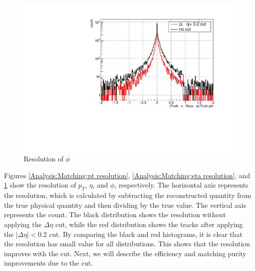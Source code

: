                 \begin{figure}[H]
                    \centering
                    \includegraphics[keepaspectratio, scale=0.4]{fig/3_5_6_reso_phi.pdf} 
                    \caption{Resolution of $\phi$}
                    \label{Analysis:Matching:phi resolution}
                \end{figure}
            Figures \ref{Analysis:Matching:pt resolution}, \ref{Analysis:Matching:eta resolution}, and \ref{Analysis:Matching:phi resolution} show the resolution of \(p_T\), \(\eta\), and \(\phi\), respectively. The horizontal axis represents the resolution, which is calculated by subtracting the reconstructed quantity from the true physical quantity and then dividing by the true value. The vertical axis represents the count. The black distribution shows the resolution without applying the \(\Delta \eta\) cut, while the red distribution shows the tracks after applying the \(|\Delta \eta| < 0.2\) cut. By comparing the black and red histograms, it is clear that the resolution has small value for all distributions. This shows that the resolution improves with the cut. Next, we will describe the efficiency and matching purity improvements due to the cut.
